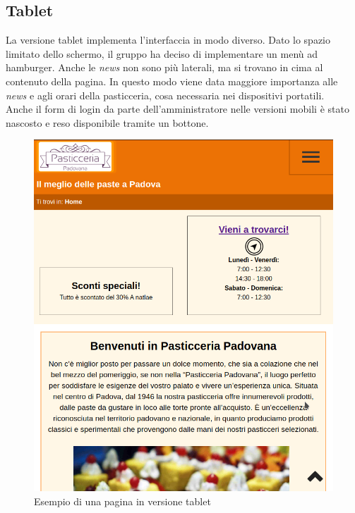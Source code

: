 \subsection{Tablet}
La versione tablet implementa l'interfaccia in modo diverso. Dato lo spazio limitato dello schermo, il gruppo ha deciso di implementare
un menù ad hamburger. Anche le \emph{news} non sono più laterali, ma si trovano in cima al contenuto della pagina. In questo modo viene data
maggiore importanza alle \emph{news} e agli orari della pasticceria, cosa necessaria nei dispositivi portatili.\\
Anche il form di login da parte dell'amministratore nelle versioni mobili è stato nascosto e reso disponibile tramite un bottone.
\begin{figure}[!h]		
    \centering		  
	\includegraphics[width=0.8\linewidth]{sezioni/Progettazione/Immagini/tablet_example.png}
	\caption{Esempio di una pagina in versione tablet}
	\label{Fig:verTablet}
\end{figure}	    
\newpage


